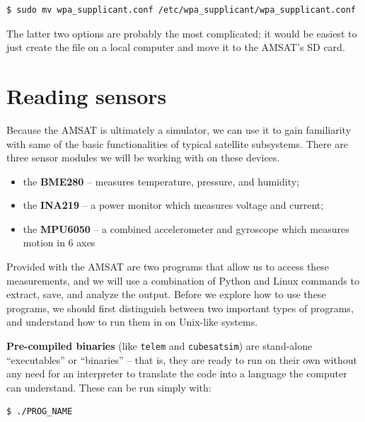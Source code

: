 \documentclass{tufte-book}
\begin{document}
\begin{lstlisting}[backgroundcolor=\color{lightgray}, breaklines=true]
$ sudo mv wpa_supplicant.conf /etc/wpa_supplicant/wpa_supplicant.conf
\end{lstlisting}

The latter two options are probably the most complicated; it would be easiest to just create the file on a local computer and move it to the AMSAT's SD card. 

\section{Reading sensors}

Because the AMSAT is ultimately a simulator, we can use it to gain familiarity with same of the basic functionalities of typical satellite subsystems. There are three sensor modules we will be working with on these devices.

\begin{itemize}
    \item the \textbf{BME280} -- measures temperature, pressure, and humidity;
    \item the \textbf{INA219} -- a power monitor which measures voltage and current;
    \item the \textbf{MPU6050} -- a combined accelerometer and gyroscope which measures motion in 6 axes
\end{itemize}

Provided with the AMSAT are two programs that allow us to access these measurements, and we will use a combination of Python and Linux commands to extract, save, and analyze the output.
Before we explore how to use these programs, we should first distinguish between two important types of programs, and understand how to run them in on Unix-like systems.

\textbf{Pre-compiled binaries} (like \verb|telem| and \verb|cubesatsim|) are stand-alone ``executables'' or ``binaries'' -- that is, they are ready to run on their own without any need for an interpreter to translate the code into a language the computer can understand. These can be run simply with:
\begin{lstlisting}[backgroundcolor=\color{lightgray}, language=Bash]
$ ./PROG_NAME
\end{lstlisting}
\end{document}
